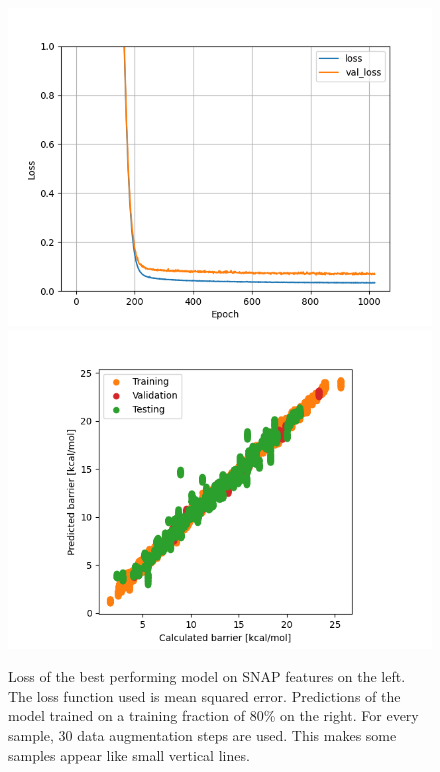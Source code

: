 \begin{figure}[!htb]
    \includegraphics[width=1.0\textwidth]{figures/regression/snap/loss_8-4.png}
  \endminipage\hfill
  \includegraphics[width=1.0\textwidth]{figures/regression/snap/scatter_8-4.png}
  \endminipage\hfill  
  \caption[Best performing model on SNAP features]{
    Loss of the best performing model on SNAP features on the left. 
    The loss function used is mean squared error.
    Predictions of the model trained on a training fraction of 80\% on the right. 
    For every sample, 30 data augmentation steps are used. This makes some samples appear like small vertical lines.
  }
  \label{fig:snap_roation}

\end{figure}


